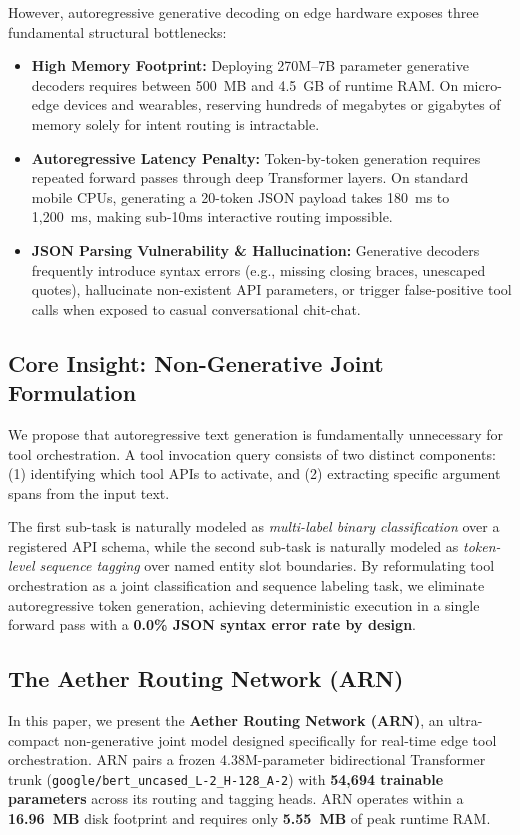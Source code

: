 \documentclass[conference]{IEEEtran}
\begin{document}
However, autoregressive generative decoding on edge hardware exposes three fundamental structural bottlenecks:
\begin{itemize}
    \item \textbf{High Memory Footprint:} Deploying 270M--7B parameter generative decoders requires between 500~MB and 4.5~GB of runtime RAM. On micro-edge devices and wearables, reserving hundreds of megabytes or gigabytes of memory solely for intent routing is intractable.
    \item \textbf{Autoregressive Latency Penalty:} Token-by-token generation requires repeated forward passes through deep Transformer layers. On standard mobile CPUs, generating a 20-token JSON payload takes 180~ms to 1,200~ms, making sub-10ms interactive routing impossible.
    \item \textbf{JSON Parsing Vulnerability \& Hallucination:} Generative decoders frequently introduce syntax errors (e.g., missing closing braces, unescaped quotes), hallucinate non-existent API parameters, or trigger false-positive tool calls when exposed to casual conversational chit-chat.
\end{itemize}

\subsection{Core Insight: Non-Generative Joint Formulation}

We propose that autoregressive text generation is fundamentally unnecessary for tool orchestration. A tool invocation query consists of two distinct components: (1) identifying which tool APIs to activate, and (2) extracting specific argument spans from the input text. 

The first sub-task is naturally modeled as \emph{multi-label binary classification} over a registered API schema, while the second sub-task is naturally modeled as \emph{token-level sequence tagging} over named entity slot boundaries. By reformulating tool orchestration as a joint classification and sequence labeling task, we eliminate autoregressive token generation, achieving deterministic execution in a single forward pass with a \textbf{0.0\% JSON syntax error rate by design}.

\subsection{The Aether Routing Network (ARN)}

In this paper, we present the \textbf{Aether Routing Network (ARN)}, an ultra-compact non-generative joint model designed specifically for real-time edge tool orchestration. ARN pairs a frozen 4.38M-parameter bidirectional Transformer trunk (\texttt{google/bert\_uncased\_L-2\_H-128\_A-2}) with \textbf{54,694 trainable parameters} across its routing and tagging heads. ARN operates within a \textbf{16.96~MB} disk footprint and requires only \textbf{5.55~MB} of peak runtime RAM.
\end{document}
